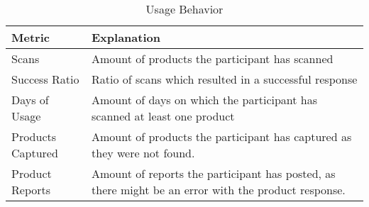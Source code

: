 \begin{table}[H]
\centering
\begin{tabular}{l l}
\toprule
Metric & Explanation\\
\midrule
Scans   &	Amount of products the participant has scanned \\
Success Ratio   &	Ratio of scans which resulted in a successful response \\
Days of Usage   &	Amount of days on which the participant has scanned at least one product \\
Products Captured   &	Amount of products the participant has captured as they were not found. \\
Product Reports &	Amount of reports the participant has posted, as there might be an error with the product response. \\
\bottomrule
\end{tabular}
\caption{Usage Behavior}
\end{table}